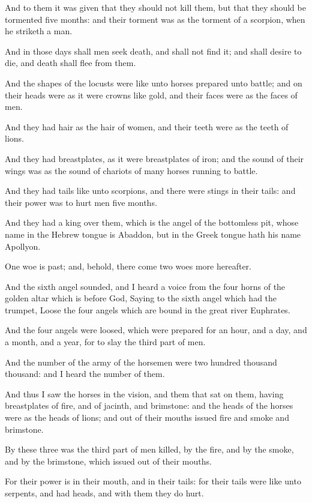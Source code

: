 \verse And to them it was given that they should not kill them, but that they should be tormented five months: and their torment was as the torment of a scorpion, when he striketh a man.

\verse And in those days shall men seek death, and shall not find it; and shall desire to die, and death shall flee from them.

\verse And the shapes of the locusts were like unto horses prepared unto battle; and on their heads were as it were crowns like gold, and their faces were as the faces of men.

\verse And they had hair as the hair of women, and their teeth were as the teeth of lions.

\verse And they had breastplates, as it were breastplates of iron; and the sound of their wings was as the sound of chariots of many horses running to battle.

\verse And they had tails like unto scorpions, and there were stings in their tails: and their power was to hurt men five months.

\verse And they had a king over them, which is the angel of the bottomless pit, whose name in the Hebrew tongue is Abaddon, but in the Greek tongue hath his name Apollyon.

\verse One woe is past; and, behold, there come two woes more hereafter.

\verse And the sixth angel sounded, and I heard a voice from the four horns of the golden altar which is before God, \verse Saying to the sixth angel which had the trumpet, Loose the four angels which are bound in the great river Euphrates.

\verse And the four angels were loosed, which were prepared for an hour, and a day, and a month, and a year, for to slay the third part of men.

\verse And the number of the army of the horsemen were two hundred thousand thousand: and I heard the number of them.

\verse And thus I saw the horses in the vision, and them that sat on them, having breastplates of fire, and of jacinth, and brimstone: and the heads of the horses were as the heads of lions; and out of their mouths issued fire and smoke and brimstone.

\verse By these three was the third part of men killed, by the fire, and by the smoke, and by the brimstone, which issued out of their mouths.

\verse For their power is in their mouth, and in their tails: for their tails were like unto serpents, and had heads, and with them they do hurt.

